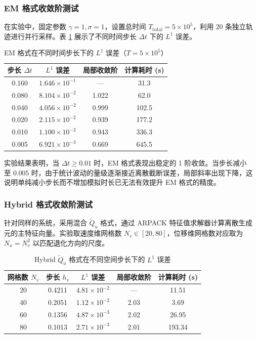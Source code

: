 	\subsubsection{EM 格式收敛阶测试}
	
	在实验中，固定参数 $\gamma=1, \sigma=1$，设置总时间 $T_{\text{total}} = 5 \times 10^5$，利用 $20$ 条独立轨迹进行并行采样。表 \ref{tab:em-error} 展示了不同时间步长 $\Delta t$ 下的 $L^1$ 误差。
	
	\begin{table}[htbp]
		\centering
		\caption{EM 格式在不同时间步长下的 $L^1$ 误差（$T=5\times 10^5$）}
		\label{tab:em-error}
		\begin{tabular}{cccc}
			\toprule
			步长 $\Delta t$ & $L^1$ 误差 & 局部收敛阶 & 计算耗时 (s) \\
			\midrule
			0.160 & $1.646\times 10^{-1}$ & — & 31.3 \\
			0.080 & $8.104\times 10^{-2}$ & 1.022 & 62.0 \\
			0.040 & $4.056\times 10^{-2}$ & 0.999 & 102.5 \\
			0.020 & $2.115\times 10^{-2}$ & 0.939 & 177.2 \\
			0.010 & $1.100\times 10^{-2}$ & 0.943 & 336.3 \\
			0.005 & $6.921\times 10^{-3}$ & 0.669 & 645.5 \\
			\bottomrule
		\end{tabular}
	\end{table}
	
	实验结果表明，当 $\Delta t \ge 0.01$ 时，EM 格式表现出稳定的 1 阶收敛。当步长减小至 $0.005$ 时，由于统计波动的量级逐渐接近离散截断误差，局部斜率出现下降，这说明单纯减小步长而不增加模拟时长已无法有效提升 EM 格式的精度。
	
	\subsubsection{Hybrid 格式收敛阶测试}
	
	针对同样的系统，采用混合 $\widetilde{Q}_u$ 格式，通过 ARPACK 特征值求解器计算离散生成元的主特征向量。实验取速度维网格数 $N_v \in [20, 80]$，位移维网格数对应取为 $N_x = N_v^2$ 以匹配退化方向的尺度。
	
	\begin{table}[htbp]
		\centering
		\caption{Hybrid $\widetilde{Q}_u$ 格式在不同空间步长下的 $L^1$ 误差}
		\label{tab:hybrid-error}
		\begin{tabular}{ccccc}
			\toprule
			网格数 $N_v$ & 步长 $h_v$ & $L^1$ 误差 & 局部收敛阶 & 计算耗时 (s) \\
			\midrule
			20 & 0.4211 & $4.81\times 10^{-2}$ & — & 11.51 \\
			40 & 0.2051 & $1.12\times 10^{-2}$ & 2.03 & 3.69 \\
			60 & 0.1356 & $4.87\times 10^{-3}$ & 2.02 & 26.95 \\
			80 & 0.1013 & $2.71\times 10^{-3}$ & 2.01 & 193.34 \\
			\bottomrule
		\end{tabular}
	\end{table}
	
